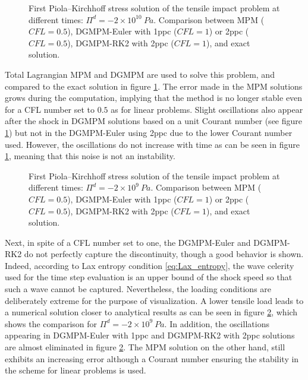 \begin{figure}[h!]
  \centering
  { \label{subfig:he_shock1}}
  { \label{subfig:he_shock2}}
  {}
  \caption{First Piola–Kirchhoff stress solution of the tensile impact problem at different times: $\Pi^d=-2\times 10^{10} \: Pa$. Comparison between MPM ($CFL=0.5$), DGMPM-Euler with 1ppc ($CFL=1$) or 2ppc ($CFL=0.5$), DGMPM-RK2 with 2ppc ($CFL=1$), and exact solution.}
  \label{fig:he_shock}
\end{figure}
Total Lagrangian MPM and DGMPM are used to solve this problem, and compared to the exact solution in figure \ref{fig:he_shock}.
The error made in the MPM solutions grows during the computation, implying that the method is no longer stable even for a CFL number set to $0.5$ as for linear problems.
Slight oscillations also appear after the shock in DGMPM solutions based on a unit Courant number (see figure \ref{fig:he_shock}) but not in the DGMPM-Euler using 2ppc due to the lower Courant number used.
However, the oscillations do not increase with time as can be seen in figure \ref{fig:he_shock}, meaning that this noise is not an instability.
\begin{figure}[h!]
  \centering
  { \label{subfig:he_low_shock1}}
  { \label{subfig:he_low_shock2}}
  {}
  \caption{First Piola–Kirchhoff stress solution of the tensile impact problem at different times: $\Pi^d=-2\times 10^{9} \: Pa$. Comparison between MPM ($CFL=0.5$), DGMPM-Euler with 1ppc ($CFL=1$) or 2ppc ($CFL=0.5$), DGMPM-RK2 with 2ppc ($CFL=1$), and exact solution.}
  \label{fig:he_low_shock}
\end{figure}
Next, in spite of a CFL number set to one, the DGMPM-Euler and DGMPM-RK2 do not perfectly capture the discontinuity, though a good behavior is shown. Indeed, according to Lax entropy condition \eqref{eq:Lax_entropy}, the wave celerity used for the time step evaluation is an upper bound of the shock speed so that such a wave cannot be captured.
Nevertheless, the loading conditions are deliberately extreme for the purpose of visualization. A lower tensile load leads to a numerical solution closer to analytical results as can be seen in figure \ref{fig:he_low_shock}, which shows the comparison for $\Pi^d=-2\times 10^{9} \: Pa$. In addition, the oscillations appearing in DGMPM-Euler with 1ppc and DGMPM-RK2 with 2ppc solutions are almost eliminated in figure \ref{fig:he_low_shock}. The MPM solution on the other hand, still exhibits an increasing error although a Courant number ensuring the stability in the scheme for linear problems is used.

